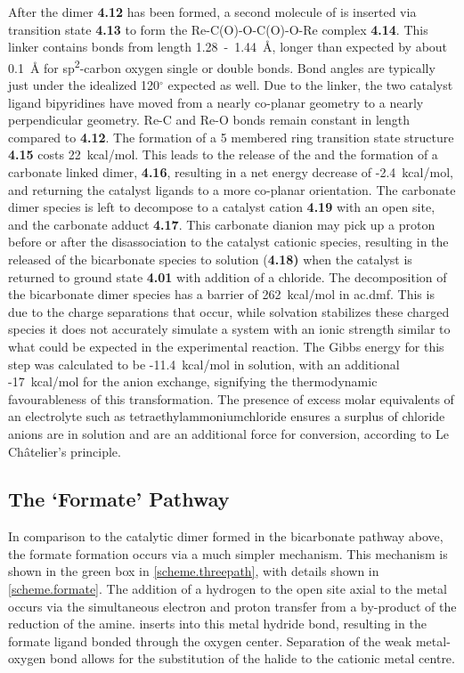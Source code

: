 After the dimer \textbf{4.12} has been formed, a second molecule of  is inserted via transition state \textbf{4.13} to form the Re-C(O)-O-C(O)-O-Re complex \textbf{4.14}. This linker contains bonds from length 1.28~-~1.44~\r{A}, longer than expected by about 0.1~\r{A} for sp\textsuperscript{2}-carbon oxygen single or double bonds\autocite{crc1998}. Bond angles are typically just under the idealized 120$^\circ$ expected as well. Due to the linker, the two catalyst ligand bipyridines have moved from a nearly co-planar geometry to a nearly perpendicular geometry. Re-C and Re-O bonds remain constant in length compared to \textbf{4.12}. The formation of a 5 membered ring transition state structure \textbf{4.15} costs 22~kcal/mol. This leads to the release of the  and the formation of a carbonate linked dimer, \textbf{4.16}, resulting in a net energy decrease of -2.4~kcal/mol, and returning the catalyst ligands to a more co-planar orientation. The carbonate dimer species is left to decompose to a catalyst cation \textbf{4.19} with an open site, and the carbonate adduct \textbf{4.17}. This carbonate dianion may pick up a proton before or after the disassociation to the catalyst cationic species, resulting in the released of the bicarbonate species to solution (\textbf{4.18)} when the catalyst is returned to ground state \textbf{4.01} with addition of a chloride. The decomposition of the bicarbonate dimer species has a barrier of 262~kcal/mol in \gls{ac.dmf}. This is due to the charge separations that occur, while solvation stabilizes these charged species it does not accurately simulate a system with an ionic strength similar to what could be expected in the experimental reaction. The Gibbs energy for this step was calculated to be -11.4~kcal/mol in solution, with an additional -17~kcal/mol for the anion exchange, signifying the thermodynamic favourableness of this transformation. The presence of excess molar equivalents of an electrolyte such as tetraethylammoniumchloride ensures a surplus of chloride anions are in solution and are an additional force for conversion, according to Le Ch\^{a}telier's principle.

\subsection{The `Formate' Pathway}\label{ss.formate}
In comparison to the catalytic dimer formed in the bicarbonate pathway above, the formate formation occurs via a much simpler mechanism. This mechanism is shown in the green box in \autoref{scheme.threepath}, with details shown in \autoref{scheme.formate}. The addition of a hydrogen to the open site axial to the metal occurs via the simultaneous electron and proton transfer from a by-product of the reduction of the amine.  inserts into this metal hydride bond, resulting in the formate ligand bonded through the oxygen center\autocite{sullivan1984, sullivan1986, creutz2007}. Separation of the weak metal-oxygen bond allows for the substitution of the halide to the cationic metal centre. 

